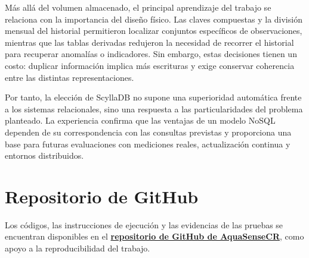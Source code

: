 \documentclass[conference]{IEEEtran}
\begin{document}
Más allá del volumen almacenado, el principal aprendizaje del trabajo se relaciona con la importancia del diseño físico. Las claves compuestas y la división mensual del historial permitieron localizar conjuntos específicos de observaciones, mientras que las tablas derivadas redujeron la necesidad de recorrer el historial para recuperar anomalías o indicadores. Sin embargo, estas decisiones tienen un costo: duplicar información implica más escrituras y exige conservar coherencia entre las distintas representaciones.

Por tanto, la elección de ScyllaDB no supone una superioridad automática frente a los sistemas relacionales, sino una respuesta a las particularidades del problema planteado. La experiencia confirma que las ventajas de un modelo NoSQL dependen de su correspondencia con las consultas previstas y proporciona una base para futuras evaluaciones con mediciones reales, actualización continua y entornos distribuidos.

\section*{Repositorio de GitHub}

Los códigos, las instrucciones de ejecución y las evidencias de las pruebas se encuentran disponibles en el \href{https://github.com/tatianard/AquaSenseCR-Grupo_6}{\textbf{repositorio de GitHub de AquaSenseCR}}, como apoyo a la reproducibilidad del trabajo.
\end{document}
